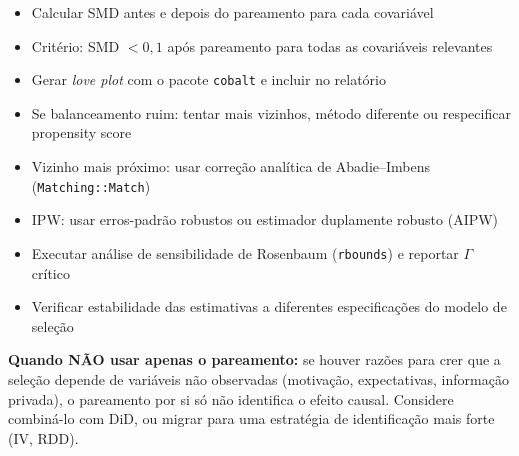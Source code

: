 \documentclass[12pt,a4paper]{article}
\begin{document}
\vspace{0.3cm}

\begin{tcolorbox}[colback=bluebg, colframe=blueframe, boxrule=0.5pt, arc=2pt,
  title={\bfseries Etapa 4 — Verificar o balanceamento (Seção 6.1)},
  coltitle=white, fonttitle=\bfseries, left=6pt, right=6pt]
\begin{itemize}[leftmargin=1.2em, itemsep=2pt]
  \item[$\square$] Calcular SMD antes e depois do pareamento para cada covariável
  \item[$\square$] Critério: SMD $< 0{,}1$ após pareamento para todas as covariáveis relevantes
  \item[$\square$] Gerar \textit{love plot} com o pacote \texttt{cobalt} e incluir no relatório
  \item[$\square$] Se balanceamento ruim: tentar mais vizinhos, método diferente ou respecificar propensity score
\end{itemize}
\end{tcolorbox}

\vspace{0.3cm}

\begin{tcolorbox}[colback=salmonbg, colframe=salmonframe, boxrule=0.5pt, arc=2pt,
  title={\bfseries Etapa 5 — Inferência e análise de sensibilidade (Seções 5.4 e 6.3)},
  coltitle=black, fonttitle=\bfseries, left=6pt, right=6pt]
\begin{itemize}[leftmargin=1.2em, itemsep=2pt]
  \item[$\square$] Vizinho mais próximo: usar correção analítica de Abadie--Imbens (\texttt{Matching::Match})
  \item[$\square$] IPW: usar erros-padrão robustos ou estimador duplamente robusto (AIPW)
  \item[$\square$] Executar análise de sensibilidade de Rosenbaum (\texttt{rbounds}) e reportar $\Gamma$ crítico
  \item[$\square$] Verificar estabilidade das estimativas a diferentes especificações do modelo de seleção
\end{itemize}
\end{tcolorbox}

\vspace{0.3cm}

\begin{tcolorbox}[colback=orangebg, colframe=orangeframe, boxrule=0.5pt, arc=2pt,
  left=6pt, right=6pt, top=4pt, bottom=4pt]
\textcolor{orangeframe}{\textbf{Quando NÃO usar apenas o pareamento:}} se houver razões para crer que a seleção depende de variáveis não observadas (motivação, expectativas, informação privada), o pareamento por si só não identifica o efeito causal. Considere combiná-lo com DiD, ou migrar para uma estratégia de identificação mais forte (IV, RDD).
\end{tcolorbox}
\end{document}

